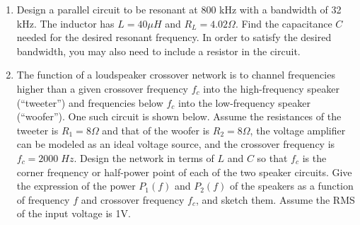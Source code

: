 \begin{enumerate}
\item Design a parallel circuit to be resonant at 800 kHz with a bandwidth
of 32 kHz. The inductor has $L=40 \mu H$ and $R_L=4.02 \Omega$. Find the
capacitance $C$ needed for the desired resonant frequency. In order to 
satisfy the desired bandwidth, you may also need to include a resistor in 
the circuit. 


\item The function of a loudspeaker crossover network is to channel 
frequencies higher than a given crossover frequency $f_c$ into the
high-frequency speaker (``tweeter'') and frequencies below $f_c$ into
the low-frequency speaker (``woofer''). One such circuit is shown below.
Assume the resistances of the tweeter is $R_1=8\Omega$ and that of the 
woofer is $R_2=8\Omega$, the voltage amplifier can be modeled as an
ideal voltage source, and the crossover frequency is $f_c=2000\; Hz$.
Design the network in terms of $L$ and $C$ so that $f_c$ is the corner
freqnency or half-power point of each of the two speaker circuits. Give 
the expression of the power $P_1(f)$ and $P_2(f)$ of the speakers as a 
function of frequency $f$ and crossover frequency $f_c$, and sketch them.
Assume the RMS of the input voltage is 1V.


%   

\end{enumerate}


